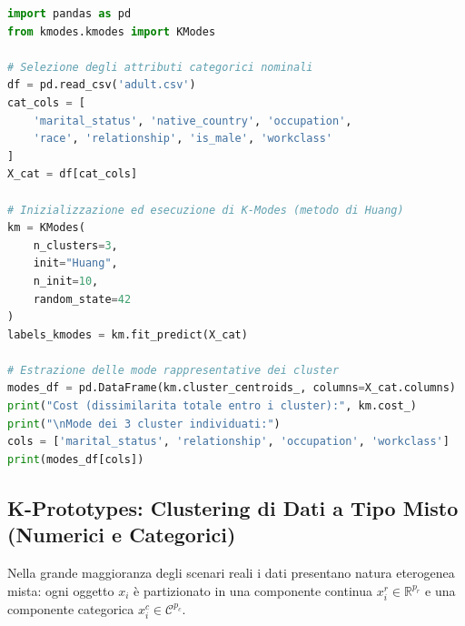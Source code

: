 \begin{lstlisting}[language=Python, caption={Clustering categorico con l'algoritmo K-Modes.}]
import pandas as pd
from kmodes.kmodes import KModes

# Selezione degli attributi categorici nominali
df = pd.read_csv('adult.csv')
cat_cols = [
    'marital_status', 'native_country', 'occupation',
    'race', 'relationship', 'is_male', 'workclass'
]
X_cat = df[cat_cols]

# Inizializzazione ed esecuzione di K-Modes (metodo di Huang)
km = KModes(
    n_clusters=3,
    init="Huang",
    n_init=10,
    random_state=42
)
labels_kmodes = km.fit_predict(X_cat)

# Estrazione delle mode rappresentative dei cluster
modes_df = pd.DataFrame(km.cluster_centroids_, columns=X_cat.columns)
print("Cost (dissimilarita totale entro i cluster):", km.cost_)
print("\nMode dei 3 cluster individuati:")
cols = ['marital_status', 'relationship', 'occupation', 'workclass']
print(modes_df[cols])
\end{lstlisting}

\FloatBarrier
\subsection{K-Prototypes: Clustering di Dati a Tipo Misto (Numerici e Categorici)}
\label{subsec:lab-kprototypes}

Nella grande maggioranza degli scenari reali i dati presentano natura eterogenea mista: ogni oggetto $x_i$ è partizionato in una componente continua $x_i^r \in \mathbb{R}^{p_r}$ e una componente categorica $x_i^c \in \mathcal{C}^{p_c}$. 

